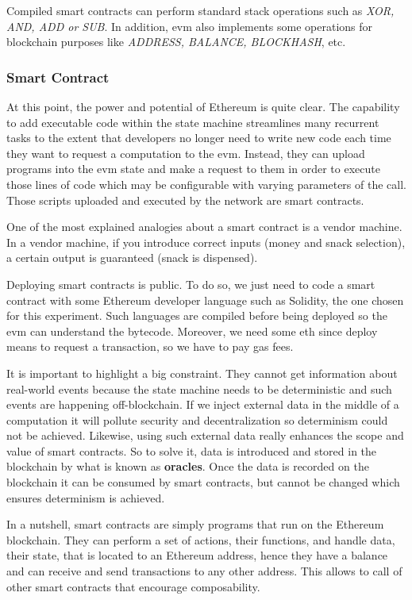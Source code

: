 {Compiled smart contracts can perform standard stack operations such as {\small\textit{XOR, AND, ADD or SUB}}. In addition, \acrshort{evm} also implements some operations for blockchain purposes like {\small \textit{ADDRESS, BALANCE, BLOCKHASH}}, etc.

}

\subsubsection{Smart Contract}
{At this point, the power and potential of Ethereum is quite clear. The capability to add executable code within the state machine streamlines many recurrent tasks to the extent that developers no longer need to write new code each time they want to request a computation to the \acrshort{evm}. Instead, they can upload programs into the \acrshort{evm} state and make a request to them in order to execute those lines of code which may be configurable with varying parameters of the call. Those scripts uploaded and executed by the network are smart contracts.

One of the most explained analogies about a smart contract is a vendor machine. In a vendor machine, if you introduce correct inputs (money and snack selection), a certain output is guaranteed (snack is dispensed).

Deploying smart contracts is public. To do so, we just need to code a smart contract with some Ethereum developer language such as Solidity, the one chosen for this experiment. Such languages are compiled before being deployed so the \acrshort{evm} can understand the bytecode. Moreover, we need some \acrshort{eth} since deploy means to request a transaction, so we have to pay gas fees.

It is important to highlight a big constraint. They cannot get information about real-world events because the state machine needs to be deterministic and such events are happening off-blockchain. If we inject external data in the middle of a computation it will pollute security and decentralization so determinism could not be achieved. Likewise, using such external data really enhances the scope and value of smart contracts. So to solve it, data is introduced and stored in the blockchain by what is known as \textbf{oracles}. Once the data is recorded on the blockchain it can be consumed by smart contracts, but cannot be changed which ensures determinism is achieved.

In a nutshell, smart contracts are simply programs that run on the Ethereum blockchain. They can perform a set of actions, their functions, and handle data, their state, that is located to an Ethereum address, hence they have a balance and can receive and send transactions to any other address. This allows to call of other smart contracts that encourage composability.
}


